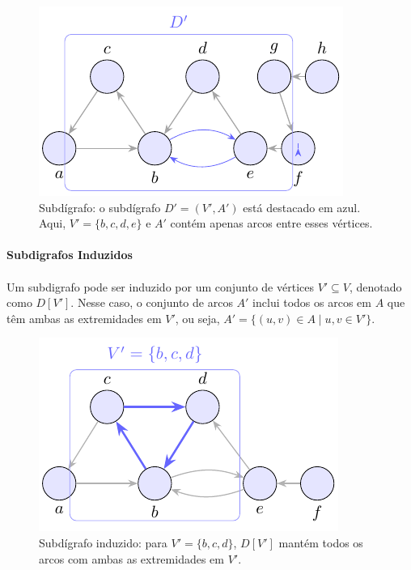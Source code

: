 \documentclass[12pt,a4paper]{article}
\def\emph#1{#1}%
\begin{document}
\begin{figure}[H]
    \centering
    \includegraphics[width=0.9\linewidth]{figures/fig_subdigrafo.pdf}

    \caption{Subdígrafo: o subdígrafo $D'=(V',A')$ está destacado em azul. Aqui, $V'=\{b,c,d,e\}$ e $A'$ contém apenas arcos entre esses vértices.}
    \label{fig:subdigrafo}
\end{figure}


\paragraph{Subdigrafos Induzidos}
\paragraph{}
Um subdigrafo pode ser \emph{induzido} por um conjunto de vértices \(V' \subseteq V\), denotado como \(D[V']\). Nesse caso, o conjunto de arcos \(A'\) inclui todos os arcos em \(A\) que têm ambas as extremidades em \(V'\), ou seja, \(A' = \{(u, v) \in A \mid u, v \in V'\}\).


\begin{figure}[H]
    \centering
    \includegraphics[width=0.9\linewidth]{figures/fig_subdigrafo_induzido.pdf}

    \caption{Subdígrafo induzido: para $V'=\{b,c,d\}$, $D[V']$ mantém todos os arcos com ambas as extremidades em $V'$.}
    \label{fig:subdigrafo-induzido}
\end{figure}
\end{document}
